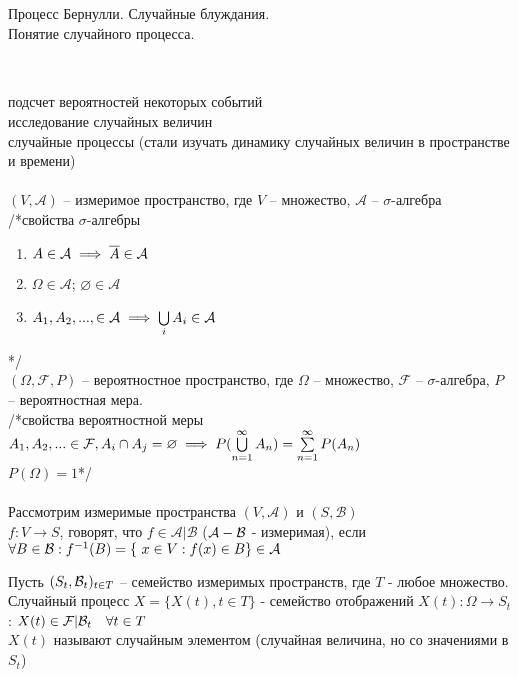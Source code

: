 \newpage
\section{}
Процесс Бернулли. Случайные блуждания.\\
Понятие случайного процесса.\\\\
\subsection{}
\MakeUppercase{} подсчет вероятностей некоторых событий\\
\MakeUppercase{}  исследование случайных величин\\
\MakeUppercase{}  случайные процессы (стали изучать динамику случайных величин в пространстве и времени)\\\\
$(V, \mathcal {A})$ -- измеримое пространство, где $V$ -- множество, $\mathcal {A}$ -- $\sigma$-алгебра\\
/*свойства $\sigma$-алгебры
\begin{enumerate}
\item $A\in \mathcal {A}\implies \overline{A}\in\mathcal {A}$
\item $\Omega\in \mathcal {A}$; $\varnothing \in \mathcal {A}$
\item $A_1, A_2, ..., \in \mathcal {A}\implies \bigcup\limits_i A_i\in \mathcal {A}$
\end{enumerate}
*/\\
$(\Omega, \mathcal{F}, P)$ -- вероятностное пространство, где $\Omega$ -- множество, $\mathcal{F}$ -- $\sigma$-алгебра, $P$ -- вероятностная мера. \\/*свойства вероятностной меры\\$A_1, A_2,... \in \mathcal{F}, A_i\cap A_j = \varnothing \implies P(\bigcup\limits_{n=1}^\infty A_n) = \sum\limits_{n=1}^\infty P(A_n)$\\ $P(\Omega) = 1$*/\\\\
Рассмотрим измеримые пространства $(V,\mathcal{A})$ и $(S, \mathcal{B})$\\
$f:V\to S$, говорят, что $f\in\mathcal{A}|\mathcal{B}$ ($\mathcal{A} - \mathcal{B}$ - измеримая), если $\forall B\in\mathcal{B}: f^{-1} (B) = \left\{\ x \in V: f(x)\in B\right\}\in \mathcal{A}$
\begin{opr}
Пусть $(S_t, \mathcal{B}_t)_{t\in T}$ -- семейство измеримых пространств, где $T$ - любое множество. Случайный процесс $X = \{X(t), t\in T\}$ - семейство отображений $X(t): \Omega \to S_t$: $X(t)\in \mathcal{F}|\mathcal{B}_t \quad \forall t\in T$\\
$X(t)$ называют случайным элементом (случайная величина, но со значениями в $S_t$)
\end{opr}
